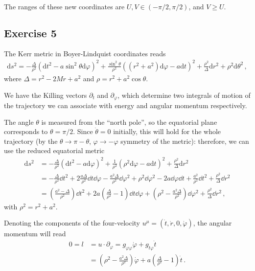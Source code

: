 \documentclass[main.tex]{subfiles}
\begin{document}
The ranges of these new coordinates are \(U, V \in (- \pi /2, \pi /2)\), 
and \(V \geq U\). 

\subsection{Exercise 5}

The Kerr metric in Boyer-Lindquist coordinates reads %
\begin{align}
\mathrm{d}s^2 = - \frac{\Delta}{\rho^2} 
\left(\mathrm{d}t^2 - a \sin^2 \theta \mathrm{d}\varphi \right)^2
+ \frac{\sin^2 \theta}{\rho^2}
\left( (r^2 + a^2) \mathrm{d}\varphi - a \mathrm{d}t\right)^2
+ \frac{\rho^2}{\Delta } \mathrm{d}r^2 + \rho^2 \mathrm{d}\theta^2
\,,
\end{align}
%
where \(\Delta = r^2 - 2Mr + a^2\) and \(\rho = r^2 + a^2 \cos \theta \).

We have the Killing vectors \(\partial_t\) and \(\partial_\varphi \), which determine two integrals of motion of the trajectory we can associate with energy and angular momentum respectively. 

The angle \(\theta\) is measured from the ``north pole'', so the equatorial plane corresponds to \(\theta = \pi / 2\). Since \(\dot{\theta} = 0\) initially, this will hold for the whole trajectory (by the \(\theta \to \pi - \theta \), \(\varphi \to - \varphi \) symmetry of the metric): therefore, we can use the reduced equatorial metric %
\begin{align}
\mathrm{d}s^2 &= - \frac{\Delta}{\rho^2} 
\left(\mathrm{d}t^2 - a \mathrm{d}\varphi \right)^2
+ \frac{1}{\rho^2}
\left( \rho^2 \mathrm{d}\varphi - a \mathrm{d}t\right)^2
+ \frac{\rho^2}{\Delta } \mathrm{d}r^2   \\
&= 
- \frac{\Delta}{\rho^2} \dd{t^2} 
+ 2 \frac{a \Delta }{\rho^2} \dd{t} \dd{\varphi } 
- \frac{a^2\Delta }{\rho^2} \dd{\varphi^2} 
+ \rho^2 \dd{\varphi^2} 
- 2a \dd{\varphi } \dd{t} + \frac{a^2}{\rho^2} \dd{t}^2 + \frac{\rho^2}{\Delta } \dd{r^2}  \\
&= \left( \frac{a^2 - \Delta }{\rho^2}\right) \dd{t^2} 
+ 2a \left( \frac{\Delta}{\rho^2} - 1 \right) \dd{t} \dd{\varphi } 
+ \left(\rho^2 - \frac{a^2 \Delta }{\rho^2}\right) \dd{\varphi^2} + \frac{\rho^2}{\Delta } \dd{r^2}
\,,
\end{align}
%
with \(\rho^2 = r^2 + a^2\). 

Denoting the components of the four-velocity \(u^\mu = (\dot{t}, \dot{r}, 0, \dot{\varphi})\), the angular momentum will read %
\begin{align}
0 = l &= u \cdot \partial_\varphi = g_{\varphi \varphi } \dot{\varphi} + g_{t \varphi } \dot{t}  \\
&= \left(\rho^2 - \frac{a^2 \Delta }{\rho^2}\right) \dot{\varphi}
+ a  \left( \frac{\Delta}{\rho^2} - 1 \right) \dot{t}
\,.
\end{align}
\end{document}
